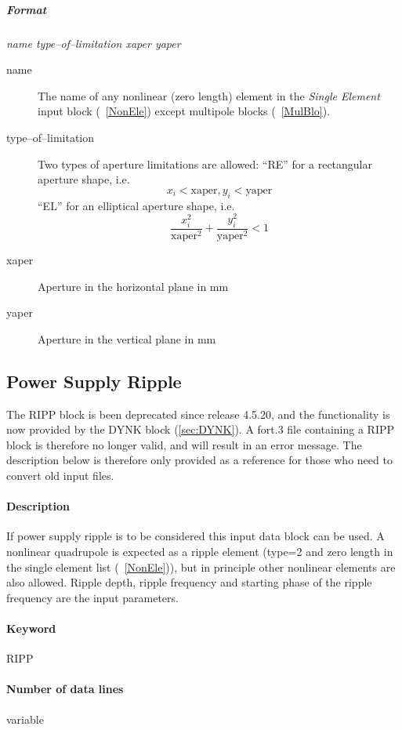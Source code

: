\documentclass[a4paper,11pt]{report}
\begin{document}
\subparagraph{Format} {\em name type--of--limitation xaper yaper}

\begin{description}
\item [name] The name of any nonlinear (zero length) element in the
  {\em Single Element} \/input block (~\ref{NonEle}) except multipole
  blocks (~\ref{MulBlo}).
\item [type--of--limitation] Two types of aperture limitations are
  allowed: \newline ``RE'' for a rectangular aperture shape, i.e.\ 
  $$
  x_{i} < \mathrm{xaper}, y_{i} < \mathrm{yaper}
  $$
  ``EL'' for an elliptical aperture shape, i.e.\ 
  $$
  \frac{x_{i}^{2}}{\mathrm{xaper}^{2}} + \frac{y_{i}^{2}}
  {\mathrm{yaper}^{2}} < 1
  $$
\item [xaper] Aperture in the horizontal plane in mm
\item [yaper] Aperture in the vertical plane in mm
\end{description}

\subsection{Power Supply Ripple} \label{PowRip}

The RIPP block is been deprecated since release 4.5.20, and the functionality is now provided by the DYNK block (\ref{sec:DYNK}).
A fort.3 file containing a RIPP block is therefore no longer valid, and will result in an error message.
The description below is therefore only provided as a reference for those who need to convert old input files.

\paragraph{Description} If power supply ripple is to be considered
this input data block can be used. A nonlinear quadrupole is expected
as a ripple element (type=2 and zero length in the single element list
(~\ref{NonEle})), but in principle other nonlinear elements are also
allowed.  Ripple depth, ripple frequency and starting phase of the
ripple frequency are the input parameters.

\paragraph{Keyword} RIPP

\paragraph{Number of data lines} variable
\end{document}
